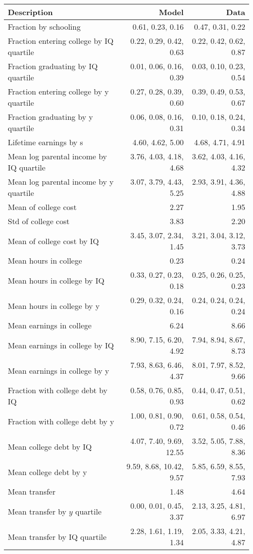 \begin{tabular}{lrr}
\hline
Description & Model  & Data  \\
\hline
Fraction by schooling & 0.61, 0.23, 0.16  & 0.47, 0.31, 0.22  \\
Fraction entering college by IQ quartile & 0.22, 0.29, 0.42, 0.63  & 0.22, 0.42, 0.62, 0.87  \\
Fraction graduating by IQ quartile & 0.01, 0.06, 0.16, 0.39  & 0.03, 0.10, 0.23, 0.54  \\
Fraction entering college by y quartile & 0.27, 0.28, 0.39, 0.60  & 0.39, 0.49, 0.53, 0.67  \\
Fraction graduating by y quartile & 0.06, 0.08, 0.16, 0.31  & 0.10, 0.18, 0.24, 0.34  \\
Lifetime earnings by s & 4.60, 4.62, 5.00  & 4.68, 4.71, 4.91  \\
Mean log parental income by IQ quartile & 3.76, 4.03, 4.18, 4.68  & 3.62, 4.03, 4.16, 4.32  \\
Mean log parental income by y quartile & 3.07, 3.79, 4.43, 5.25  & 2.93, 3.91, 4.36, 4.88  \\
Mean of college cost & 2.27  & 1.95  \\
Std of college cost & 3.83  & 2.20  \\
Mean of college cost by IQ & 3.45, 3.07, 2.34, 1.45  & 3.21, 3.04, 3.12, 3.73  \\
Mean hours in college & 0.23  & 0.24  \\
Mean hours in college by IQ & 0.33, 0.27, 0.23, 0.18  & 0.25, 0.26, 0.25, 0.23  \\
Mean hours in college by y & 0.29, 0.32, 0.24, 0.16  & 0.24, 0.24, 0.24, 0.24  \\
Mean earnings in college & 6.24  & 8.66  \\
Mean earnings in college by IQ & 8.90, 7.15, 6.20, 4.92  & 7.94, 8.94, 8.67, 8.73  \\
Mean earnings in college by y & 7.93, 8.63, 6.46, 4.37  & 8.01, 7.97, 8.52, 9.66  \\
Fraction with college debt by IQ & 0.58, 0.76, 0.85, 0.93  & 0.44, 0.47, 0.51, 0.62  \\
Fraction with college debt by y & 1.00, 0.81, 0.90, 0.72  & 0.61, 0.58, 0.54, 0.46  \\
Mean college debt by IQ & 4.07, 7.40, 9.69, 12.55  & 3.52, 5.05, 7.88, 8.36  \\
Mean college debt by y & 9.59, 8.68, 10.42, 9.57  & 5.85, 6.59, 8.55, 7.93  \\
Mean transfer & 1.48  & 4.64  \\
Mean transfer by $y$ quartile & 0.00, 0.01, 0.45, 3.37  & 2.13, 3.25, 4.81, 6.97  \\
Mean transfer by IQ quartile & 2.28, 1.61, 1.19, 1.34  & 2.05, 3.33, 4.21, 4.87  \\
\hline
\end{tabular}%
